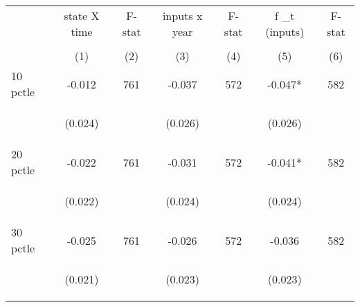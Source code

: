 \begin{tabular}{lcccccc}


\toprule


\multicolumn{1}{l}{} & \multicolumn{1}{c}{state X time} & \multicolumn{1}{c}{F-stat} & \multicolumn{1}{c}{inputs x year} & \multicolumn{1}{c}{F-stat} & \multicolumn{1}{c}{f \_t (inputs)} & \multicolumn{1}{c}{F-stat}  \\

\cmidrule(l{1mm}r{1mm}){2-3} \cmidrule(l{1mm}r{1mm}){4-5} \cmidrule(l{1mm}r{1mm}){6-7}   \\

 & (1) & (2) & (3) & (4) & (5) & (6)  \\ 
 

\hline

10 pctle   &  -0.012   &  761  &   -0.037  &  572 &  -0.047*  &  582 \\

\vspace{4pt} &  \begin{footnotesize}(0.024)\end{footnotesize}   & &
			    \begin{footnotesize}(0.026)\end{footnotesize}   & &
			    \begin{footnotesize}(0.026)\end{footnotesize}   & 
			     \\          


20 pctle   &  -0.022   &  761  &   -0.031  &  572 &  -0.041*  &  582   \\

\vspace{4pt} &  \begin{footnotesize}(0.022)\end{footnotesize}   & &
			    \begin{footnotesize}(0.024)\end{footnotesize}   & &
			    \begin{footnotesize}(0.024)\end{footnotesize}   &
			     \\          


30 pctle   &  -0.025   &  761  &   -0.026  &  572 &  -0.036  &  582   \\


\vspace{4pt} &  \begin{footnotesize}(0.021)\end{footnotesize}   & &
			    \begin{footnotesize}(0.023)\end{footnotesize}   & &
			    \begin{footnotesize}(0.023)\end{footnotesize}   &
			     \\          




\end{tabular}
